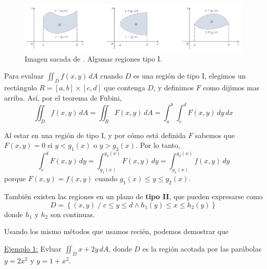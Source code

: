 \documentclass[12pt]{article}
\begin{document}
\begin{figure}[H]
  \centering
  \includegraphics[width=\linewidth]{imagenes/regiones-tipo-1.png}
  \caption{Imagen sacada de \parencite{stewart2}. Algunas regiones tipo I.}
  \label{fig:regiones-tipo-1}
\end{figure}

Para evaluar $ \iint_{D} f(x,y) \,dA $ cuando $ D $ es una región de tipo I, elegimos un rectángulo $ R=\left[a,b\right]\times \left[c,d\right] $ que contenga $ D $, y definimos $ F $ como dijimos mas arriba. Así, por el teorema de Fubini,
\[
  \iint_{D} f(x,y) \,dA=\iint_{R} F(x,y) \,dA=\int_{a}^{b} \int_{c}^{d} F(x,y) \,dy\,dx
\]

Al estar en una región de tipo I, y por cómo está definida $ F $ sabemos que $ F(x,y)=0 $ si $ y<g_{1}(x) $ o $ y>g_{2}(x) $. Por lo tanto,
\[
  \int_{c}^{d} F(x,y) \,dy = \int_{g_{1}(x)}^{g_{2}(x)} F(x,y) \,dy=\int_{g_{1}(x)}^{g_{2}(x)} f(x,y) \,dy
\]
porque $ F(x,y)=f(x,y) $ cuando $ g_{1}(x)\leq y\leq g_{2}(x) $.

\vspace{0.2cm}
\vspace{0.2cm}

También existen las regiones en un plano de \textbf{tipo II}, que pueden expresarse como
\[
  D=\left\{(x,y) \;/\; c\leq y\leq d \land h_{1}(y)\leq x\leq h_{2}(y)\right\}
\]
donde $ h_{1} $ y $ h_{2} $ son continuas.

Usando los mismo métodos que usamos recién, podemos demostrar que

\vspace{0.2cm}
\vspace{0.2cm}

\underline{Ejemplo 1:} Evluar $ \iint_{D} x+2y \,dA $, donde $ D $ es la región acotada por las parábolas $ y=2x^2 $ y $ y=1+x^2 $.
\end{document}
